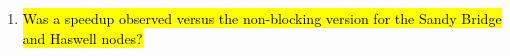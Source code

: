 \begin{enumerate}
  \item \hl{Was a speedup observed versus the non-blocking version for the Sandy Bridge and Haswell nodes?}


\end{enumerate}

